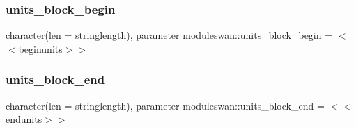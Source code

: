 \subsubsection{\texorpdfstring{units\+\_\+block\+\_\+begin}{units\_block\_begin}}
{\footnotesize\ttfamily character(len = stringlength), parameter moduleswan\+::units\+\_\+block\+\_\+begin = \textquotesingle{}$<$$<$beginunits$>$$>$\textquotesingle{}\hspace{0.3cm}{\ttfamily [private]}}

\mbox{\label{namespacemoduleswan_acc49f731e5b61076515a1cd444d0cdc3}} 
\subsubsection{\texorpdfstring{units\+\_\+block\+\_\+end}{units\_block\_end}}
{\footnotesize\ttfamily character(len = stringlength), parameter moduleswan\+::units\+\_\+block\+\_\+end = \textquotesingle{}$<$$<$endunits$>$$>$\textquotesingle{}\hspace{0.3cm}{\ttfamily [private]}}

